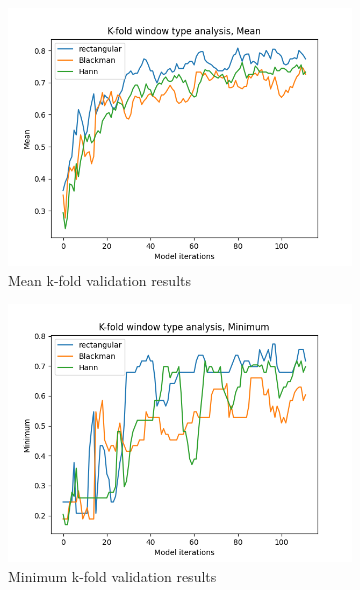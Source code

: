 \documentclass[class=report,11pt,crop=false]{standalone}
\begin{document}
\begin{figure}[hbt!]
    \begin{subfigure}[b]{0.5\textwidth}
        \includegraphics[width=\linewidth]{Images/kfoldMean.png}
        \caption{Mean k-fold validation results}
        \label{fig:KMean}
    \end{subfigure}
    \hfill
    \begin{subfigure}[b]{0.5\textwidth}
        \includegraphics[width=\linewidth]{Images/kfoldMinimum.png}
        \caption{Minimum k-fold validation results}
        \label{fig:KMin}
    \end{subfigure}
    \hfill
    \begin{subfigure}[b]{0.5\textwidth}

\end{subfigure}
\end{figure}
\end{document}
